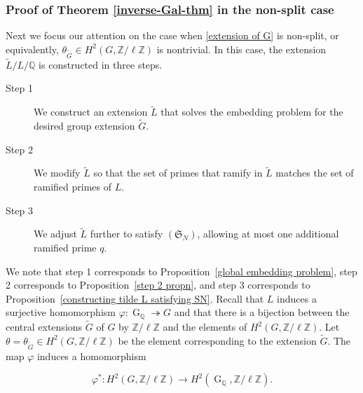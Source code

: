 \documentclass[11pt,reqno]{amsart}
\newcommand{\Z}{\mathbb{Z}}
\newcommand{\Q}{\mathbb{Q}}
\newcommand{\op}[1]{\operatorname{#1}}
\numberwithin{equation}{section}
\begin{document}
\subsubsection{Proof of Theorem \ref{inverse-Gal-thm} in the non-split case}\label{non-split-case-proof-subsubsection}
\par Next we focus our attention on the case when \eqref{extension of G} is non-split, or equivalently, $\theta_{\widetilde{G}}\in H^2(G, \Z/\ell \Z)$ is nontrivial. In this case, the extension $\widetilde{L}/L/\Q$ is constructed in three steps.
\begin{description}
    \item[Step 1]  We construct an extension \( \widetilde{L} \) that solves the embedding problem for the desired group extension \( \widetilde{G} \).  
\item[Step 2] We modify \( \widetilde{L} \) so that the set of primes that ramify in $\widetilde{L}$ matches the set of ramified primes of \( L \).  
\item[Step 3] We adjust \( \widetilde{L} \) further to satisfy \( (\mathfrak{S}_N) \), allowing at most one additional ramified prime $q$.
\end{description}
We note that step 1 corresponds to Proposition~\ref{global embedding problem}, step 2 corresponds to Proposition~\ref{step 2 propn}, and step 3 corresponds to Proposition~\ref{constructing tilde L satisfying SN}. Recall that $L$ induces a surjective homomorphism $\varphi: \op{G}_{\Q}\twoheadrightarrow G$ and that there is a bijection between the central extensions $\widetilde{G}$ of $G$ by $\mathbb{Z}/\ell \Z$ and the elements of $H^{2}\left(G, \Z/\ell \Z\right)$. Let $\theta=\theta_{\widetilde{G}} \in H^{2}\left(G, \Z/\ell\Z\right)$ be the element corresponding to the extension $\widetilde{G}$. The map $\varphi$ induces a homomorphism

\begin{equation}\label{defn of phi star}
\varphi^{*}: H^{2}\left(G, \Z/\ell\Z\right) \longrightarrow H^{2}\left(\op{G}_{\Q}, \Z/\ell\Z\right).
\end{equation}
\end{document}

